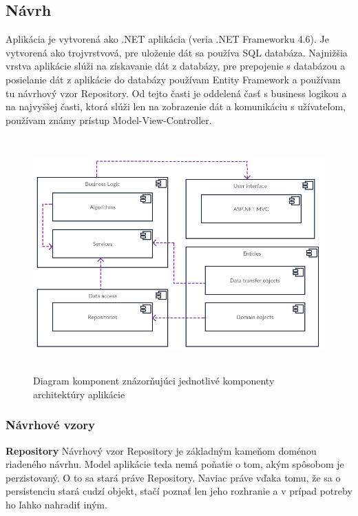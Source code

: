 \documentclass[slovak,master,public,dept460,male,cpdeclaration,oneside]{diploma}
\begin{document}
\subsection{Návrh}
Aplikácia je vytvorená ako .NET aplikácia (veria .NET Frameworku 4.6). Je vytvorená ako trojvrstvová, pre uloženie dát sa používa SQL databáza. Najnižšia vrstva aplikácie slúži na získavanie dát z databázy, pre prepojenie s databázou a posielanie dát z aplikácie do databázy používam Entity Framework a používam tu návrhový vzor Repository. Od tejto časti je oddelená časť s business logikou a na najvyššej časti, ktorá slúži len na zobrazenie dát a komunikáciu s užívateľom, používam známy prístup Model-View-Controller.


\begin{figure}[H]
\centering
\includegraphics[width=15cm, height=9cm]{figures/diagram_komponent}
\caption{Diagram komponent znázorňujúci jednotlivé komponenty architektúry aplikácie}
\end{figure}

\subsubsection{Návrhové vzory}

\indent
\indent \textbf{Repository}
Návrhový vzor Repository je základným kameňom doménou riadeného návrhu. Model aplikácie teda nemá poňatie o tom, akým spôsobom je perzistovaný. O to sa stará práve Repository. Naviac práve vďaka tomu, že sa o persistenciu stará cudzí objekt, stačí poznať len jeho rozhranie a v prípad potreby ho ľahko nahradiť iným. \cite{11}
\end{document}
